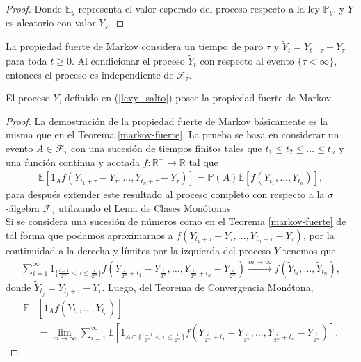 \begin{proof}
Donde $\mathbb{E}_y$ representa el valor esperado del proceso respecto a la ley $\mathbb{P}_y$, y $Y$ es aleatorio con valor $Y_s$.
\end{proof}

La propiedad fuerte de Markov considera un tiempo de paro $\tau$ y $\tilde{Y}_{t} = Y_{t + \tau} - Y_{\tau}$ para toda $t \geq 0$. Al condicionar el proceso $\tilde{Y}_{t}$ con respecto al evento $\{ \tau < \infty \}$, entonces el proceso es independiente de $\mathcal{F}_{\tau}$.

\begin{proposition}
El proceso $Y$, definido en (\ref{levy_salto}) posee la propiedad fuerte de Markov.
\end{proposition}
\begin{proof}
La demostración de la propiedad fuerte de Markov básicamente es la misma que en el Teorema \ref{markov-fuerte}. La prueba se basa en considerar un evento $A \in \mathcal{F}_{\tau}$ con una sucesión de tiempos finitos tales que $t_1 \leq t_2 \leq \ldots \leq t_n$ y una función continua y acotada $f: \mathbb{R}^{+} \rightarrow \mathbb{R}$ tal que
\begin{align*}
\mathbb{E} \left[ 1_A f \left( Y_{t_1 + \tau} - Y_{\tau}, \ldots, Y_{t_n + \tau} - Y_{\tau} \right) \right] = \mathbb{P}(A) \mathbb{E} \left[ f \left( Y_{t_1}, \ldots, Y_{t_n} \right) \right],
\end{align*}
para después extender este resultado al proceso completo con respecto a la $\sigma$-álgebra $\mathcal{F}_{\tau}$ utilizando el Lema de Clases Monótonas. \\

Si se considera una sucesión de números como en el Teorema \ref{markov-fuerte} de tal forma que podamos aproximarnos a $ f\left( Y_{t_1 + \tau} - Y_{\tau}, \ldots, Y_{t_n + \tau} - Y_{\tau} \right)$, por la continuidad a la derecha y límites por la izquierda del proceso $Y$ tenemos que
\begin{align*}
\sum_{i = 1}^{\infty} 1_{ \{ \frac{i-1}{2^m} < \tau \leq \frac{i}{2^m} \} } f \left( Y_{\frac{i}{2^m} + t_1} - Y_{\frac{i}{2^m}}, \ldots, Y_{\frac{i}{2^m} + t_n} - Y_{\frac{i}{2^m}}  \right) \xrightarrow{m \rightarrow \infty} f \left( \tilde{Y}_{t_1}, \ldots, \tilde{Y}_{t_n} \right),
\end{align*}
donde $\tilde{Y}_{t_j} = Y_{t_j + \tau} - Y_{\tau}$. Luego, del Teorema de Convergencia Monótona, 
\begin{align}
	\mathbb{E} & \left[1_A f \left( \tilde{Y}_{t_1}, \ldots, \tilde{Y}_{t_n} \right) \right] \nonumber \\
	& = \lim_{m \rightarrow \infty} \sum_{i = 1}^{\infty} \mathbb{E} \left[ 1_{ A \cap \{\frac{i-1}{2^m} < \tau \leq \frac{i}{2^m}\}} f \left( Y_{\frac{i}{2^m} + t_1} - Y_{\frac{i}{2^m}}, \ldots, Y_{\frac{i}{2^m} + t_n} - Y_{\frac{i}{2^m}}  \right) \right]. \label{iphone}
\end{align}


\end{proof}
